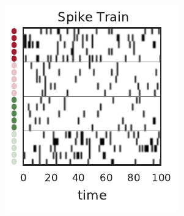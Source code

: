 \begin{figure}[t!]
\begin{subfigure}[b]{1.6in}
    \label{fig:representation_population}
  \end{subfigure}
  \begin{subfigure}[b]{1.9in}
    \centering
    \caption{}
    \vspace{-.3in}
    \includegraphics[width=\textwidth]{figures/ch7/example_spiketrain}
    \label{fig:representation_spiketrain}
  \end{subfigure}
  \begin{subfigure}[b]{1.8in}
    \centering
    \caption{}
    \vspace{-.3in}

\end{subfigure}
\end{figure}
